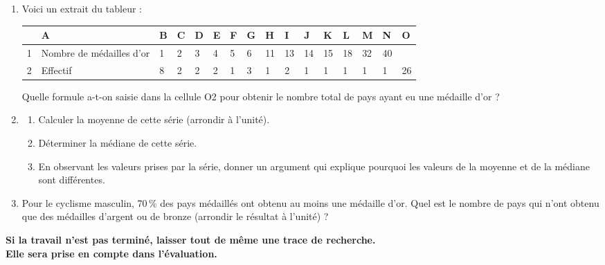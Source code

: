 \begin{enumerate}
\item Voici un extrait du tableur :

\medskip

\begin{tabularx}{\linewidth}{|c|m{1.5cm}|*{14}{X|}}\hline
 &A									&B	&C	&D	&E	&F	&G	&H	&I	&J	&K	&L	&M	&N	&O\\ \hline 
1&\footnotesize Nombre de médailles d'or	&1	&2	&3	&4	&5	&6	&11	&13&14&15&18&32&40&\\ \hline 
2&\footnotesize Effectif					&8 	&2 	&2	&2	&1	&3	&1	&2&1&1&1&1&1&26\\ \hline
\end{tabularx}

\medskip

Quelle formule a-t-on saisie dans la cellule O2 pour obtenir le nombre total de pays ayant eu une médaille d'or ? 
\item 	
	\begin{enumerate}
		\item Calculer la moyenne de cette série (arrondir \`{a} l'unité). 
		\item Déterminer la médiane de cette série. 
		\item En observant les valeurs prises par la série, donner un argument qui explique pourquoi les	valeurs de	la moyenne et de la	médiane sont différentes.
	\end{enumerate}
\item Pour le cyclisme masculin, 70\,\% des pays médaillés ont obtenu au moins une médaille d'or. Quel est le nombre de	pays qui n'ont obtenu que des médailles d'argent ou de bronze (arrondir le résultat \`{a} l'unité) ? 
\end{enumerate}

\textbf{Si la travail n'est pas terminé, laisser tout de même une trace de recherche.\\  
Elle sera prise en compte dans l'évaluation.}
